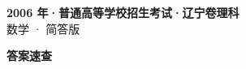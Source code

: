 \documentclass[zihao=-4, a4paper]{ctexart}
\begin{document}
\begin{center}
  {\Large\bfseries 2006 年·普通高等学校招生考试·辽宁卷理科}\\[4pt]
  {\large 数学 · 简答版}
\end{center}
\medskip
{}

\clearpage
{}
\begin{center}{\Large\bfseries 答案速查}\end{center}
\medskip

\end{document}
